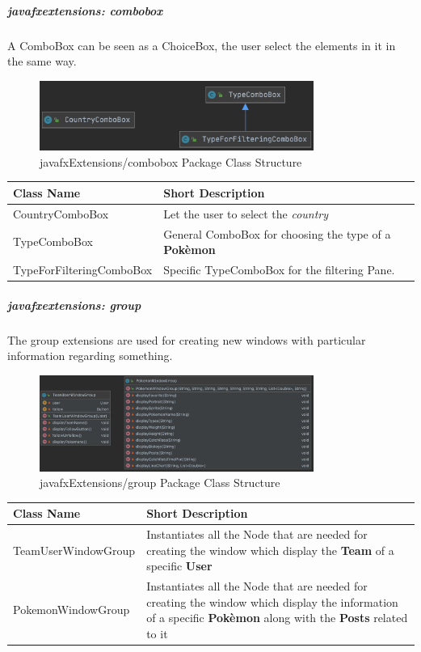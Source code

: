 \subparagraph{javafxextensions: combobox}
A ComboBox can be seen as a ChoiceBox, the user select the elements in it in the same way.
\begin{figure}[H]
	\centering
	\includegraphics[width=0.8\textwidth]{img/javafx_combobox_package.png}
	\caption{javafxExtensions/combobox Package Class Structure}
\end{figure}
\begingroup
\setlength{\tabcolsep}{10pt} %
\renewcommand{\arraystretch}{1.5} %
\begin{center}
	\begin{longtable}{| m{14em} | m{19em} |} 
		\hline
		\textbf{Class Name} & \textbf{Short Description} \\ [0.5ex] 
		\hline
		CountryComboBox & Let the user to select the \textit{country}\\ 
		\hline
		TypeComboBox & General ComboBox for choosing the type of a \textbf{Pokèmon}\\ 
		\hline
		TypeForFilteringComboBox & Specific TypeComboBox for the filtering Pane.\\ 
		\hline
	\end{longtable}
\end{center}
\endgroup

\subparagraph{javafxextensions: group}
The group extensions are used for creating new windows with particular information regarding something. 
\begin{figure}[H]
	\centering
	\includegraphics[width=0.8\textwidth]{img/javafx_group_package.png}
	\caption{javafxExtensions/group Package Class Structure}
\end{figure}
\begingroup
\setlength{\tabcolsep}{10pt} %
\renewcommand{\arraystretch}{1.5} %
\begin{center}
	\begin{longtable}{| m{14em} | m{19em} |} 
		\hline
		\textbf{Class Name} & \textbf{Short Description} \\ [0.5ex] 
		\hline
		TeamUserWindowGroup & Instantiates all the Node that are needed for creating the window which display the \textbf{Team} of a specific \textbf{User}\\ 
		\hline
		PokemonWindowGroup & Instantiates all the Node that are needed for creating the window which display the information of a specific \textbf{Pokèmon} along with the \textbf{Posts} related to it\\ 
		\hline
	\end{longtable}
\end{center}
\endgroup

